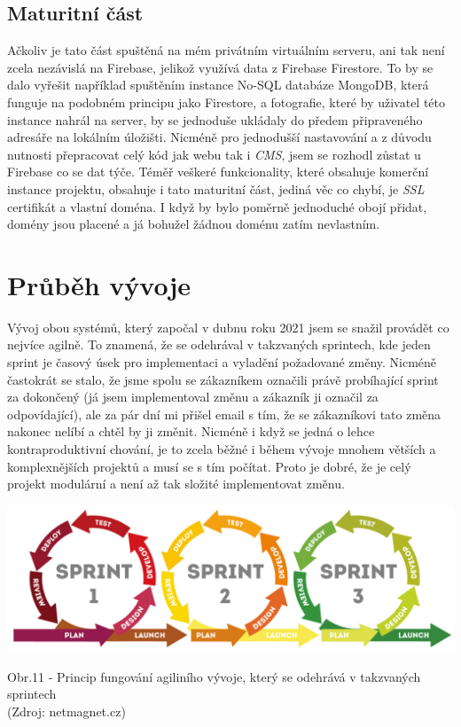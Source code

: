 \documentclass[12pt,a4paper]{report}
\begin{document}
  \section{Maturitní část}
  Ačkoliv je tato část spuštěná na mém privátním virtuálním serveru, ani tak není zcela
  nezávislá na Firebase, jelikož využívá data z Firebase Firestore. To by se dalo vyřešit
  například spuštěním instance No-SQL databáze MongoDB, která funguje na podobném principu jako 
  Firestore, a fotografie, které by uživatel této instance nahrál na server, by se jednoduše ukládaly
  do předem připraveného adresáře na lokálním úložišti. Nicméně pro jednodušší nastavování a z důvodu nutnosti
  přepracovat celý kód jak webu tak i \emph{CMS}, jsem se rozhodl zůstat u Firebase co se dat týče. 
  Téměř veškeré funkcionality, které obsahuje komerční instance projektu, obsahuje i tato maturitní část, 
  jediná věc co chybí, je \emph{SSL} certifikát a vlastní doména. I když by bylo poměrně jednoduché obojí přidat,
  domény jsou placené a já bohužel žádnou doménu zatím nevlastním.
 
  \chapter{Průběh vývoje}
  Vývoj obou systémů, který započal v dubnu roku 2021 jsem se snažil provádět co nejvíce agilně. To znamená,
  že se odehrával v takzvaných sprintech, kde jeden sprint je časový úsek pro implementaci a vyladění požadované změny.
  Nicméně častokrát se stalo, že jsme spolu se zákazníkem označili právě probíhající sprint za dokončený (já jsem implementoval změnu a zákazník ji označil za odpovídající), ale za pár dní mi 
  přišel email s tím, že se zákazníkovi tato změna nakonec nelíbí a chtěl by ji změnit. Nicméně i když se jedná o lehce kontraproduktivní chování, 
  je to zcela běžné i během vývoje mnohem větších a komplexnějších projektů a musí se s tím počítat. Proto je dobré, že je celý projekt modulární a není až tak složité implementovat změnu.
  
  \vspace*{0.5cm}
  \noindent\includegraphics[width=\linewidth]{agile.png}
  \begin{center}
    Obr.11 -  Princip fungování agiliního vývoje, který se odehrává v takzvaných sprintech \\
    (Zdroj: netmagnet.cz)
  \end{center}
  \vspace*{0.5cm}
 
\end{document}
